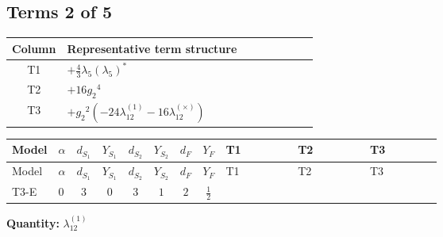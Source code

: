 \documentclass[8pt]{article}
\begin{document}
\begin{landscape}
\subsection*{Terms 2 of 5}
\begin{center}
\begin{tabular}{@{}c >{\raggedright\arraybackslash}p{0.82\linewidth}@{}}
\toprule
Column & Representative term structure \\
\midrule
T1 & \(\displaystyle +\frac{4}{3} {\lambda_5} \left({\lambda_5}\right)^{*}\) \\
\midrule
T2 & \(\displaystyle +16 {g_2}^4\) \\
\midrule
T3 & \(\displaystyle +{g_2}^2 (-24 {\lambda_{12}^{(1)}}-16 {\lambda_{12}^{(\times)}})\) \\
\midrule
\bottomrule
\end{tabular}
\end{center}
\smallskip
\tiny
\begin{longtable}{@{}llcccccc >{\raggedright\arraybackslash}p{0.21\linewidth} >{\raggedright\arraybackslash}p{0.21\linewidth} >{\raggedright\arraybackslash}p{0.21\linewidth}@{}}
\toprule
Model & $\alpha$ & $d_{S_1}$ & $Y_{S_1}$ & $d_{S_2}$ & $Y_{S_2}$ & $d_F$ & $Y_F$ & T1 & T2 & T3 \\
\midrule
\endfirsthead
\toprule
Model & $\alpha$ & $d_{S_1}$ & $Y_{S_1}$ & $d_{S_2}$ & $Y_{S_2}$ & $d_F$ & $Y_F$ & T1 & T2 & T3 \\
\midrule
\endhead
T3-E & $0$ & $3$ & $0$ & $3$ & $1$ & $2$ & $\frac{1}{2}$ & \scriptsize\adjustbox{max width=\linewidth}{$\begin{gathered} +\frac{4}{3} {\lambda_5} \left({\lambda_5}\right)^{*}\end{gathered}$} & \scriptsize\adjustbox{max width=\linewidth}{$\begin{gathered} +16 {g_2}^4\end{gathered}$} & \scriptsize\adjustbox{max width=\linewidth}{$\begin{gathered} +{g_2}^2 (-24 {\lambda_{12}^{(1)}}-16 {\lambda_{12}^{(\times)}})\end{gathered}$} \\
\midrule
\bottomrule
\end{longtable}
\clearpage
\noindent\textbf{Quantity: }$\lambda_{12}^{(1)}$\par\smallskip

\end{landscape}
\end{document}
